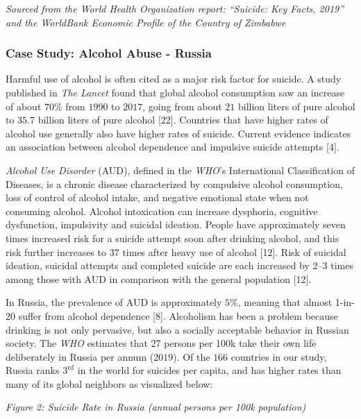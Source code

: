 \documentclass[]{article}
\begin{document}
\emph{Sourced from the World Health Organization report: ``Suicide: Key
Facts, 2019'' and the WorldBank Economic Profile of the Country of
Zimbabwe}

\newpage 

\subsubsection{Case Study: Alcohol Abuse -
Russia}\label{case-study-alcohol-abuse---russia}

Harmful use of alcohol is often cited as a major risk factor for
suicide. A study published in \emph{The Lancet} found that global
alcohol consumption saw an increase of about \(70\%\) from \(1990\) to
\(2017\), going from about \(21\) billion liters of pure alcohol to
\(35.7\) billion liters of pure alcohol {[}22{]}. Countries that have
higher rates of alcohol use generally also have higher rates of suicide.
Current evidence indicates an association between alcohol dependence and
impulsive suicide attempts {[}4{]}.

\emph{Alcohol Use Disorder} (AUD), defined in the \emph{WHO}'s
International Classification of Diseases, is a chronic disease
characterized by compulsive alcohol consumption, loss of control of
alcohol intake, and negative emotional state when not consuming alcohol.
Alcohol intoxication can increase dysphoria, cognitive dysfunction,
impulsivity and suicidal ideation. People have approximately seven times
increased risk for a suicide attempt soon after drinking alcohol, and
this risk further increases to \(37\) times after heavy use of alcohol
{[}12{]}. Risk of suicidal ideation, suicidal attempts and completed
suicide are each increased by 2--3 times among those with AUD in
comparison with the general population {[}12{]}.

In Russia, the prevalence of AUD is approximately \(5\%\), meaning that
almost 1-in-20 suffer from alcohol dependence {[}8{]}. Alcoholism has
been a problem because drinking is not only pervasive, but also a
socially acceptable behavior in Russian society. The \emph{WHO}
estimates that 27 persons per 100k take their own life deliberately in
Russia per annum (\(2019\)). Of the \(166\) countries in our study,
Russia ranks \(3^{\text{rd}}\) in the world for suicides per capita, and
has higher rates than many of its global neighbors as visualized below:

\emph{Figure 2: Suicide Rate in Russia (annual persons per 100k
population)}
\end{document}

